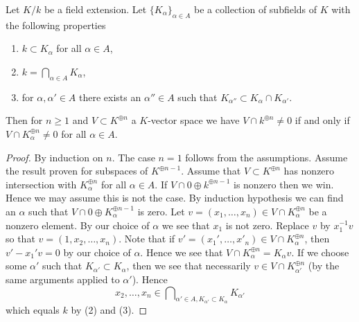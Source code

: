 \begin{lemma}
\label{lemma-intersection-subfields-subspace}
Let $K/k$ be a field extension. Let $\{K_\alpha\}_{\alpha \in A}$
be a collection of subfields of $K$ with the following properties
\begin{enumerate}
\item $k \subset K_\alpha$ for all $\alpha \in A$,
\item $k = \bigcap_{\alpha \in A} K_\alpha$,
\item for $\alpha, \alpha' \in A$ there exists an $\alpha'' \in A$
such that $K_{\alpha''} \subset K_\alpha \cap K_{\alpha'}$.
\end{enumerate}
Then for $n \geq 1$ and $V \subset K^{\oplus n}$ a $K$-vector space
we have $V \cap k^{\oplus n} \not = 0$ if and only if
$V \cap K_\alpha^{\oplus n} \not = 0$ for all $\alpha \in A$.
\end{lemma}

\begin{proof}
By induction on $n$. The case $n = 1$ follows from the assumptions.
Assume the result proven for subspaces of $K^{\oplus n - 1}$.
Assume that $V \subset K^{\oplus n}$ has nonzero intersection with
$K_\alpha^{\oplus n}$ for all $\alpha \in A$. If
$V \cap 0 \oplus k^{\oplus n - 1}$ is nonzero then we win. Hence we may
assume this is not the case. By induction hypothesis we can find
an $\alpha$ such that $V \cap 0 \oplus K_\alpha^{\oplus n - 1}$
is zero. Let $v = (x_1, \ldots, x_n) \in V \cap K_\alpha^{\oplus n}$
be a nonzero element.
By our choice of $\alpha$ we see that $x_1$ is not zero.
Replace $v$ by $x_1^{-1}v$ so that $v = (1, x_2, \ldots, x_n)$.
Note that if $v' = (x_1', \ldots, x'_n) \in V \cap K_\alpha^{\oplus n}$, then
$v' - x_1'v = 0$ by our choice of $\alpha$. Hence we see that
$V \cap K_\alpha^{\oplus n} = K_\alpha v$. If we choose some
$\alpha'$ such that $K_{\alpha'} \subset K_\alpha$, then we
see that necessarily $v \in V \cap K_{\alpha'}^{\oplus n}$ (by the
same arguments applied to $\alpha'$). Hence
$$
x_2, \ldots, x_n \in
\bigcap\nolimits_{\alpha' \in A, K_{\alpha'} \subset K_\alpha} K_{\alpha'}
$$
which equals $k$ by (2) and (3).
\end{proof}
